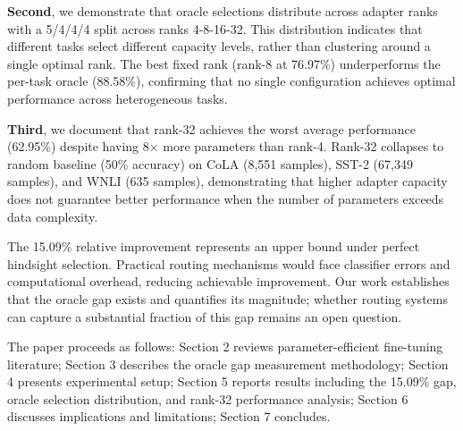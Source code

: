 \textbf{Second}, we demonstrate that oracle selections distribute across adapter ranks with a 5/4/4/4 split across ranks 4-8-16-32. This distribution indicates that different tasks select different capacity levels, rather than clustering around a single optimal rank. The best fixed rank (rank-8 at 76.97\%) underperforms the per-task oracle (88.58\%), confirming that no single configuration achieves optimal performance across heterogeneous tasks.

\textbf{Third}, we document that rank-32 achieves the worst average performance (62.95\%) despite having 8× more parameters than rank-4. Rank-32 collapses to random baseline (50\% accuracy) on CoLA (8,551 samples), SST-2 (67,349 samples), and WNLI (635 samples), demonstrating that higher adapter capacity does not guarantee better performance when the number of parameters exceeds data complexity.

The 15.09\% relative improvement represents an upper bound under perfect hindsight selection. Practical routing mechanisms would face classifier errors and computational overhead, reducing achievable improvement. Our work establishes that the oracle gap exists and quantifies its magnitude; whether routing systems can capture a substantial fraction of this gap remains an open question.

The paper proceeds as follows: Section 2 reviews parameter-efficient fine-tuning literature; Section 3 describes the oracle gap measurement methodology; Section 4 presents experimental setup; Section 5 reports results including the 15.09\% gap, oracle selection distribution, and rank-32 performance analysis; Section 6 discusses implications and limitations; Section 7 concludes.
